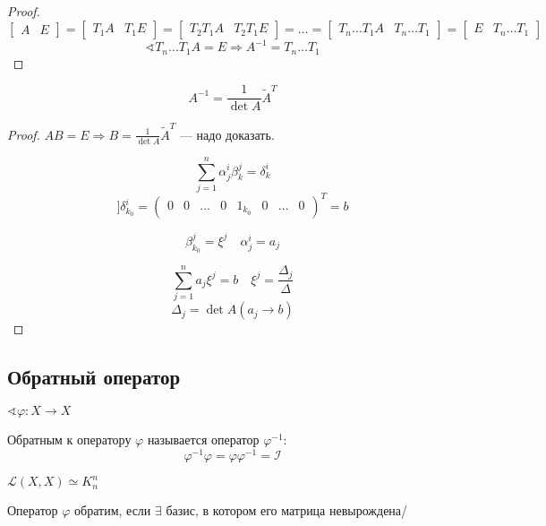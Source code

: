 \begin{proof}
    $$\left[\begin{array}{c|c}
        A & E
    \end{array}\right] = \left[\begin{array}{c|c}
        T_1A & T_1E
    \end{array}\right] = \left[\begin{array}{c|c}
        T_2T_1A & T_2T_1E
    \end{array}\right] = \ldots = \left[\begin{array}{c|c}
        T_n\ldots T_1A & T_n\ldots T_1
    \end{array}\right] = \left[\begin{array}{c|c}
        E & T_n\ldots T_1
    \end{array}\right]$$
    $$\sphericalangle T_n\ldots T_1A=E\Rightarrow A^{-1}=T_n\ldots T_1$$
\end{proof}

\begin{theorem}
    $$A^{-1}=\frac{1}{\det A}\tilde A^T$$
\end{theorem}
\begin{proof}
    $AB=E \Rightarrow B=\frac{1}{\det A}\tilde A^T$ --- надо доказать.

    $$\sum\limits_{j=1}^n \alpha_j^i\beta_k^j = \delta_k^i$$
    $$] \delta^i_{k_0}=\begin{pmatrix}
        0 & 0 & \ldots & 0 & 1_{k_0} & 0 & \ldots & 0
    \end{pmatrix}^T = b$$

    $$\beta^j_{k_0} = \xi^j \quad \alpha_j^i = a_j$$

    $$\sum\limits_{j=1}^n a_j\xi^j = b \quad \xi^j = \frac{\Delta_j}{\Delta}$$
    $$\Delta_j=\det A(a_j\to b)$$
\end{proof}

\subsection{Обратный оператор}

$\sphericalangle \varphi : X\to X$

\begin{definition}
    Обратным к оператору $\varphi$ называется оператор $\varphi^{-1}$:
    $$\varphi^{-1}\varphi=\varphi\varphi^{-1}=\mathcal{I}$$
\end{definition}

$\mathcal{L}(X,X)\simeq K_n^n$

\begin{theorem}
    Оператор $\varphi$ обратим, если $\exists$ базис, в котором его матрица невырождена/
\end{theorem}

